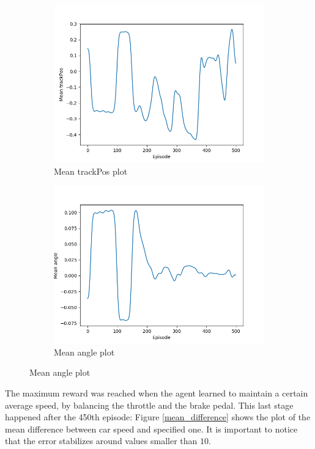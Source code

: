 \documentclass[Lau,oneside,noexaminfo]{sapthesis} %
\begin{document}
\begin{figure}[H]
\centering
\caption{Car position sensors' plots}
\begin{subfigure}{.5\textwidth}
  \centering
  \includegraphics[width=.9\linewidth]{mean_trackpos}
  \caption{Mean trackPos plot}
  \label{mean_trackpos}
\end{subfigure}%
\begin{subfigure}{.5\textwidth}
  \centering
  \includegraphics[width=.9\linewidth]{mean_angle}
  \caption{Mean angle plot}
  \label{mean_angle}
\end{subfigure}
\label{mean_plots}
\end{figure}
The maximum reward was reached when the agent learned to maintain a certain average speed, by balancing the throttle and the brake pedal. This last stage happened after the 450th episode: Figure \ref{mean_difference} shows the plot of the mean difference between car speed and specified one. It is important to notice that the error stabilizes around values smaller than $10$.
\end{document}
